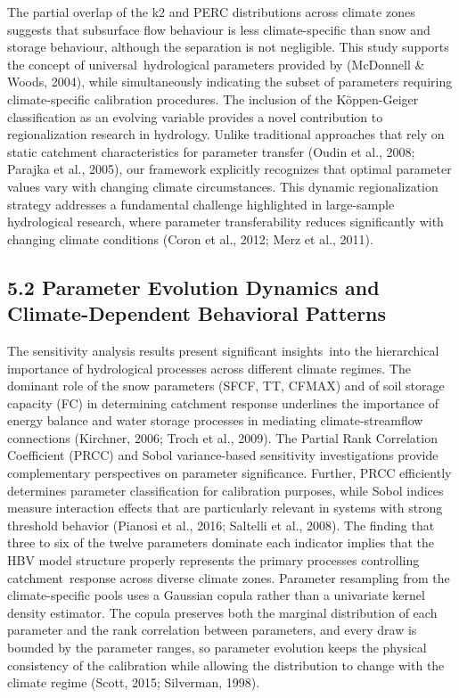 \documentclass[
]{article}
\begin{document}
The partial overlap of the k2 and PERC distributions across climate
zones suggests that subsurface flow behaviour is less climate-specific
than snow and storage behaviour, although the separation is not
negligible. This study supports the concept of universal~hydrological
parameters provided by (McDonnell \& Woods, 2004), while simultaneously
indicating the subset of parameters requiring climate-specific
calibration procedures. The inclusion of the Köppen-Geiger
classification as an evolving variable provides a novel contribution to
regionalization research in hydrology. Unlike traditional approaches
that rely on static catchment characteristics for parameter transfer
(Oudin et al., 2008; Parajka et al., 2005), our framework explicitly
recognizes that optimal parameter values vary with changing climate
circumstances. This dynamic regionalization strategy addresses a
fundamental challenge highlighted in large-sample hydrological research,
where parameter transferability reduces significantly with changing
climate conditions (Coron et al., 2012; Merz et al., 2011).

\subsection{5.2 Parameter Evolution Dynamics and Climate-Dependent
Behavioral
Patterns}\label{parameter-evolution-dynamics-and-climate-dependent-behavioral-patterns}

The sensitivity analysis results present significant insights~into the
hierarchical importance of hydrological processes across different
climate regimes. The dominant role of the snow parameters (SFCF, TT,
CFMAX) and of soil storage capacity (FC) in determining catchment
response underlines the importance of energy balance and water storage
processes in mediating climate-streamflow connections (Kirchner, 2006;
Troch et al., 2009). The Partial Rank Correlation Coefficient (PRCC) and
Sobol variance-based sensitivity investigations provide complementary
perspectives on parameter significance. Further, PRCC efficiently
determines parameter classification for calibration purposes, while
Sobol indices measure interaction effects that are particularly relevant
in systems with strong threshold behavior (Pianosi et al., 2016;
Saltelli et al., 2008). The finding that three to six of the twelve
parameters dominate each indicator implies that the HBV model structure
properly represents the primary processes controlling catchment~response
across diverse climate zones. Parameter resampling from the
climate-specific pools uses a Gaussian copula rather than a univariate
kernel density estimator. The copula preserves both the marginal
distribution of each parameter and the rank correlation between
parameters, and every draw is bounded by the parameter ranges, so
parameter evolution keeps the physical consistency of the calibration
while allowing the distribution to change with the climate regime
(Scott, 2015; Silverman, 1998).
\end{document}
